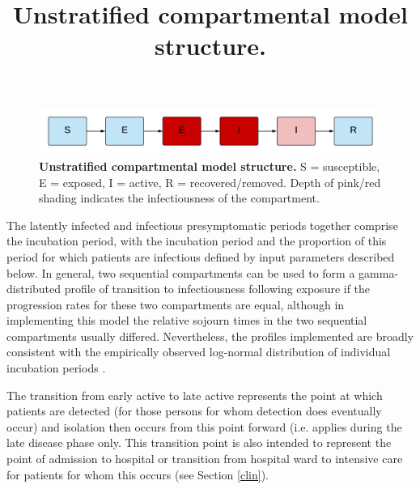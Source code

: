 \begin{figure}[ht]
    \includegraphics[width=\textwidth]{../covid_19/covid_19_seeiir.pdf}
   \title{Unstratified compartmental model structure.}
    \caption{\textbf{Unstratified compartmental model structure.} S = susceptible, E = exposed, I = active, R = recovered/removed. Depth of pink/red shading indicates the infectiousness of the compartment.}
    \label{fig:seeiir}
\end{figure}

The latently infected and infectious presymptomatic periods together comprise the incubation period, with the incubation period and the proportion of this period for which patients are infectious defined by input parameters described below. In general, two sequential compartments can be used to form a gamma-distributed profile of transition to infectiousness following exposure if the progression rates for these two compartments are equal, although in implementing this model the relative sojourn times in the two sequential compartments usually differed. Nevertheless, the profiles implemented are broadly consistent with the empirically observed log-normal distribution of individual incubation periods \cite{RN13}.

The transition from early active to late active represents the point at which patients are detected (for those persons for whom detection does eventually occur) and isolation then occurs from this point forward (i.e. applies during the late disease phase only. This transition point is also intended to represent the point of admission to hospital or transition from hospital ward to intensive care for patients for whom this occurs (see Section \ref{clin}).
